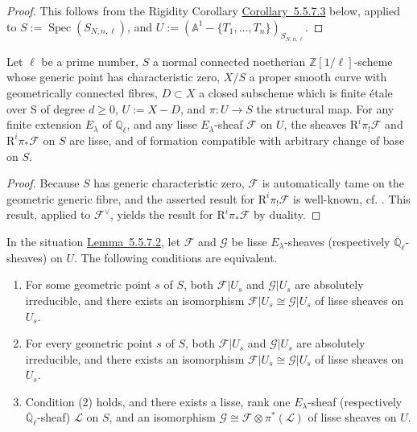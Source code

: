 \begin{proof}
This follows from the Rigidity Corollary \hyperref[cor:5.5.7.3]{Corollary~5.5.7.3}
below, applied to \(S:=\operatorname{Spec}(S_{N,n,\ell})\), and
\(U:=(\mathbb{A}^1-\{T_1,\ldots,T_n\})_{S_{N,n,\ell}}\).
\end{proof}

Let \(\ell\) be a prime number, \(S\) a normal connected noetherian
\(\mathbb{Z}[1/\ell]\)-scheme whose generic point has
characteristic zero, \(X/S\) a proper smooth curve with geometrically
connected fibres, \(D\subset X\) a closed subscheme which is finite étale over
S of degree \(d\geq 0\), \(U:=X-D\), and \(\pi:U\to S\) the structural map.
For any finite extension \(E_\lambda\) of \(\mathbb{Q}_\ell\), and any lisse
\(E_\lambda\)-sheaf \(\mathcal{F}\) on \(U\), the sheaves
\(\mathrm{R}^i\pi_!\mathcal{F}\) and \(\mathrm{R}^i\pi_*\mathcal{F}\) on \(S\)
are lisse, and of formation compatible with arbitrary change of base on \(S\).

\begin{proof}
Because \(S\) has generic characteristic zero, \(\mathcal{F}\) is automatically
tame on the geometric generic fibre, and the asserted result for
\(\mathrm{R}^i\pi_!\mathcal{F}\) is well-known, cf. \cite[4.7.1]{Ka-SE}. This
result, applied to \(\mathcal{F}^{\vee}\), yields the result for
\(\mathrm{R}^i\pi_*\mathcal{F}\) by duality.
\end{proof}

In the situation \hyperref[lem:5.5.7.2]{Lemma~5.5.7.2}, let \(\mathcal{F}\)
and \(\mathcal{G}\) be lisse \(E_\lambda\)-sheaves (respectively
\(\overline{\mathbb{Q}}_\ell\)-sheaves) on \(U\). The following conditions are
equivalent.
\begin{enumerate}[label=(\arabic*)]
\item For some geometric point \(s\) of \(S\), both \(\mathcal{F}\vert U_s\)
and \(\mathcal{G}\vert U_s\) are absolutely irreducible, and there exists an
isomorphism
\(\mathcal{F}\vert U_s\cong\mathcal{G}\vert U_s\) of lisse sheaves on \(U_s\).

\item For every geometric point \(s\) of \(S\), both
\(\mathcal{F}\vert U_s\) and \(\mathcal{G}\vert U_s\) are absolutely
irreducible, and there exists an isomorphism
\(\mathcal{F}\vert U_s\cong\mathcal{G}\vert U_s\) of lisse sheaves on \(U_s\).

\item Condition (2) holds, and there exists a lisse, rank one
\(E_\lambda\)-sheaf (respectively \(\overline{\mathbb{Q}}_\ell\)-sheaf)
\(\mathcal{L}\) on \(S\), and an isomorphism
\(\mathcal{G}\cong\mathcal{F}\otimes\pi^*(\mathcal{L})\) of lisse sheaves on
\(U\).
\end{enumerate}

